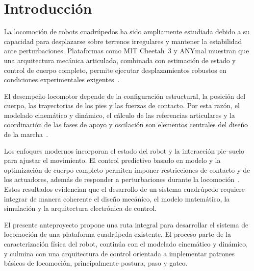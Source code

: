 \chapter{Introducción}

La locomoción de robots cuadrúpedos ha sido ampliamente estudiada debido a su capacidad para desplazarse sobre terrenos irregulares y mantener la estabilidad ante perturbaciones. Plataformas como MIT Cheetah~3 y ANYmal muestran que una arquitectura mecánica articulada, combinada con estimación de estado y control de cuerpo completo, permite ejecutar desplazamientos robustos en condiciones experimentales exigentes~\cite{bledt2018cheetah3,hutter2016anymal}.

El desempeño locomotor depende de la configuración estructural, la posición del cuerpo, las trayectorias de los pies y las fuerzas de contacto. Por esta razón, el modelado cinemático y dinámico, el cálculo de las referencias articulares y la coordinación de las fases de apoyo y oscilación son elementos centrales del diseño de la marcha~\cite{zamani2011dynamics,bellicoso2018dynamic}.

Los enfoques modernos incorporan el estado del robot y la interacción pie--suelo para ajustar el movimiento. El control predictivo basado en modelo y la optimización de cuerpo completo permiten imponer restricciones de contacto y de los actuadores, además de responder a perturbaciones durante la locomoción~\cite{dicarlo2018mpc,neunert2018wholebody}. Estos resultados evidencian que el desarrollo de un sistema cuadrúpedo requiere integrar de manera coherente el diseño mecánico, el modelo matemático, la simulación y la arquitectura electrónica de control.

El presente anteproyecto propone una ruta integral para desarrollar el sistema de locomoción de una plataforma cuadrúpeda existente. El proceso parte de la caracterización física del robot, continúa con el modelado cinemático y dinámico, y culmina con una arquitectura de control orientada a implementar patrones básicos de locomoción, principalmente postura, paso y gateo.
